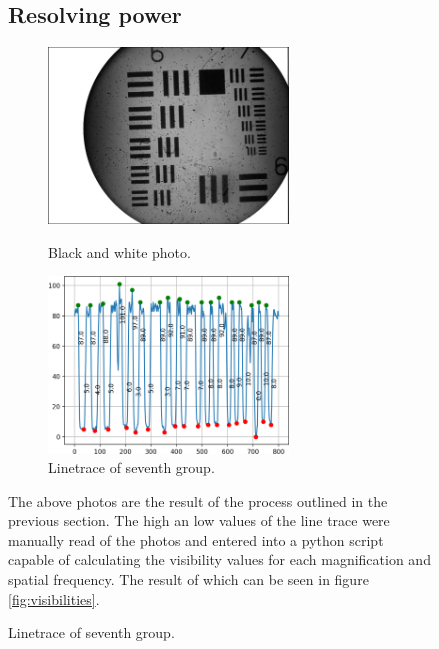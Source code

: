 \begin{figure}[h!]
{\subsection{Resolving power}
\begin{figure}[h!]
    \centering
    \begin{minipage}{.5\textwidth}
      \centering
      \includegraphics[width=0.7\textwidth,keepaspectratio]{afbeeldingen/process_visibility/m3_bw.jpg}
      \caption{Black and white photo.}
      \label{fig:resolution_target}
    \end{minipage}%
    \begin{minipage}{.5\textwidth}
      \centering
      \includegraphics[width=0.7\textwidth,keepaspectratio]{afbeeldingen/process_visibility/m3_rpg_7.png}
      \caption{Linetrace of seventh group.}
      \label{fig:linetrace}
    \end{minipage}
\end{figure}

The above photos are the result of the process outlined in the previous section. The high an low values of the line trace were manually read of the photos and entered into a python script capable of calculating the visibility values for each magnification and spatial frequency. The result of which can be seen in figure \ref{fig:visibilities}.\\

}
\end{figure}
